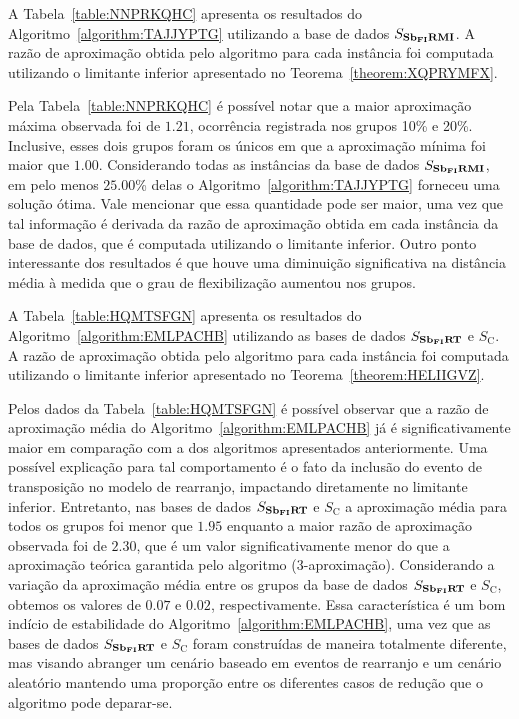 A Tabela~\ref{table:NNPRKQHC} apresenta os resultados do Algoritmo~\ref{algorithm:TAJJYPTG} utilizando a base de dados $S_{\textbf{Sb\textsubscript{FI}RMI}}{}$. A razão de aproximação obtida pelo algoritmo para cada instância foi computada utilizando o limitante inferior apresentado no Teorema~\ref{theorem:XQPRYMFX}.



Pela Tabela~\ref{table:NNPRKQHC} é possível notar que a maior aproximação máxima observada foi de $1.21$, ocorrência registrada nos grupos 10\% e 20\%. Inclusive, esses dois grupos foram os únicos em que a aproximação mínima foi maior que $1.00$. Considerando todas as instâncias da base de dados $S_{\textbf{Sb\textsubscript{FI}RMI}}{}$, em pelo menos $25.00$\% delas o Algoritmo~\ref{algorithm:TAJJYPTG} forneceu uma solução ótima. Vale mencionar que essa quantidade pode ser maior, uma vez que tal informação é derivada da razão de aproximação obtida em cada instância da base de dados, que é computada utilizando o limitante inferior. Outro ponto interessante dos resultados é que houve uma diminuição significativa na distância média à medida que o grau de flexibilização aumentou nos grupos.

A Tabela~\ref{table:HQMTSFGN} apresenta os resultados do Algoritmo~\ref{algorithm:EMLPACHB} utilizando as bases de dados $S_{\textbf{Sb\textsubscript{FI}RT}}{}$ e $S_{\text{C}}$. A razão de aproximação obtida pelo algoritmo para cada instância foi computada utilizando o limitante inferior apresentado no Teorema~\ref{theorem:HELIIGVZ}.



Pelos dados da Tabela~\ref{table:HQMTSFGN} é possível observar que a razão de aproximação média do Algoritmo~\ref{algorithm:EMLPACHB} já é significativamente maior em comparação com a dos algoritmos apresentados anteriormente. Uma possível explicação para tal comportamento é o fato da inclusão do evento de transposição no modelo de rearranjo, impactando diretamente no limitante inferior. Entretanto, nas bases de dados $S_{\textbf{Sb\textsubscript{FI}RT}}{}$ e $S_{\text{C}}$ a aproximação média para todos os grupos foi menor que $1.95$ enquanto a maior razão de aproximação observada foi de $2.30$, que é um valor significativamente menor do que a aproximação teórica garantida pelo algoritmo ($3$-aproximação). Considerando a variação da aproximação média entre os grupos da base de dados $S_{\textbf{Sb\textsubscript{FI}RT}}{}$ e $S_{\text{C}}$, obtemos os valores de $0.07$ e $0.02$, respectivamente. Essa característica é um bom indício de estabilidade do Algoritmo~\ref{algorithm:EMLPACHB}, uma vez que as bases de dados $S_{\textbf{Sb\textsubscript{FI}RT}}{}$ e $S_{\text{C}}$ foram construídas de maneira totalmente diferente, mas visando abranger um cenário baseado em eventos de rearranjo e um cenário aleatório mantendo uma proporção entre os diferentes casos de redução que o algoritmo pode deparar-se.

